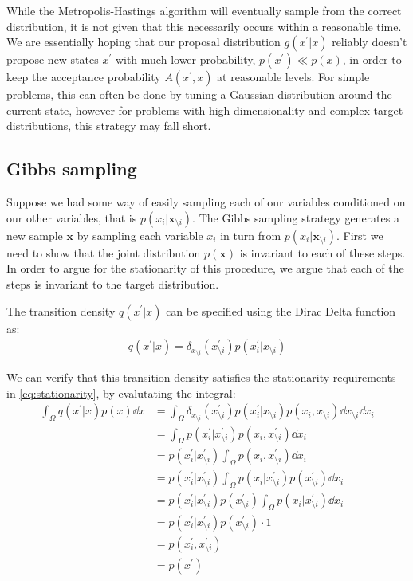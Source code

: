 While the Metropolis-Hastings algorithm will eventually sample from the correct distribution, it is not given that this necessarily occurs within a reasonable time. 
We are essentially hoping that our proposal distribution $g(x^\prime | x)$ reliably doesn't propose new states $x^\prime$ with much lower probability, $p(x^\prime) \ll p(x) $, in order to keep the acceptance probability $A(x^\prime, x)$ at reasonable levels. 
For simple problems, this can often be done by tuning a Gaussian distribution around the current state, however for problems with high dimensionality and complex target distributions, this strategy may fall short.

\subsection{Gibbs sampling}

Suppose we had some way of easily sampling each of our variables conditioned on our other variables, that is $p(x_i|\bm{x}_{\setminus i})$. 
The Gibbs sampling strategy generates a new sample $\bm{x}$ by sampling each variable $x_i$ in turn from $p(x_i|\bm{x}_{\setminus i})$.  
First we need to show that the joint distribution $p(\bm{x})$ is invariant to each of these steps. 
In order to argue for the stationarity of this procedure, we argue that each of the steps is invariant to the target distribution.

The transition density $q(x^\prime| x)$ can be specified using the Dirac Delta function as:
\begin{align*}
    q(x^\prime| x) = \delta_{x_{\setminus i}}(x^\prime_{\setminus i}) p(x_i^\prime|x_{\setminus i})
\end{align*}

We can verify that this transition density satisfies the stationarity requirements in \cref{eq:stationarity}, by evalutating the integral:
\begin{align*}
    \int_{\Omega} q(x^\prime| x) p(x) \dd{x}  
    &= \int_{\Omega}  \delta_{x_{\setminus i}}(x^\prime_{\setminus i}) p(x_i^\prime|x_{\setminus i}) p(x_i,x_{\setminus i}) \dd{x_{\setminus i}} \dd{x_i} \\
    &= \int_{\Omega} p(x^\prime_i|x^\prime_{\setminus i}) p(x_i,x^\prime_{\setminus i}) \dd{x_i} \\ 
    &= p(x^\prime_i|x^\prime_{\setminus i}) \int_{\Omega}  p(x_i,x^\prime_{\setminus i}) \dd{x_i} \\ 
    &= p(x^\prime_i|x^\prime_{\setminus i}) \int_{\Omega}  p(x_i | x^\prime_{\setminus i}) p(x^\prime_{\setminus i}) \dd{x_i} \\ 
    &= p(x^\prime_i|x^\prime_{\setminus i}) p(x^\prime_{\setminus i}) \int_{\Omega}  p(x_i | x^\prime_{\setminus i})  \dd{x_i} \\ 
    &= p(x^\prime_i|x^\prime_{\setminus i}) p(x^\prime_{\setminus i}) \cdot 1 \\
    &=  p(x^\prime_i,x^\prime_{\setminus i})  \\
    &= p(x^\prime)
\end{align*}

